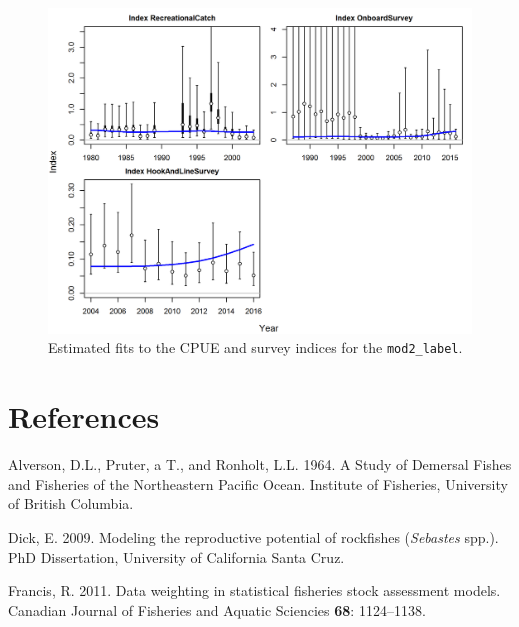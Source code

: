 \documentclass[12pt,]{article}
\begin{document}
\begin{figure}[htbp]
\centering
\includegraphics{r4ss/plots_mod2/index0_all_indices_fit.png}
\caption{Estimated fits to the CPUE and survey indices for the
\texttt{mod2\_label}. \label{fig:index_fits2}}
\end{figure}

\FloatBarrier 

\FloatBarrier

\FloatBarrier

\FloatBarrier

\newpage

\color{black}

\section*{References}\label{references}

\renewcommand{\thepage}{}


\hypertarget{refs}{}
\hypertarget{ref-Alverson1964}{}
Alverson, D.L., Pruter, a T., and Ronholt, L.L. 1964. A Study of
Demersal Fishes and Fisheries of the Northeastern Pacific Ocean.
Institute of Fisheries, University of British Columbia.

\hypertarget{ref-Dick2009}{}
Dick, E. 2009. Modeling the reproductive potential of rockfishes
(\emph{Sebastes} spp.). PhD Dissertation, University of California Santa
Cruz.

\hypertarget{ref-Francis2011}{}
Francis, R. 2011. Data weighting in statistical fisheries stock
assessment models. Canadian Journal of Fisheries and Aquatic Sciencies
\textbf{68}: 1124--1138.
\end{document}

